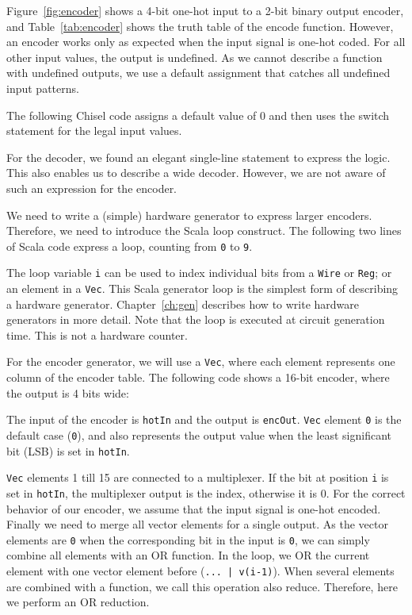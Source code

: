 \documentclass[%
    10pt,
    headinclude, footexclude,
    openright, %
    notitlepage,
    cleardoubleempty,
    headsepline,
    pointlessnumbers,
    bibtotoc, idxtotoc,
    ]{scrbook}
\newcommand{\code}[1]{{\lstinline[basicstyle=\small\ttfamily]{#1}}}
\begin{document}
Figure~\ref{fig:encoder} shows a 4-bit one-hot input to a 2-bit binary output encoder, and
Table~\ref{tab:encoder} shows the truth table of the encode function. However, an encoder
works only as expected when the input signal is one-hot coded. For all other input values, the output
is undefined. As we cannot describe a function with undefined outputs, we use a default
assignment that catches all undefined input patterns.

The following Chisel code assigns a default value of 0 and then uses the switch statement
for the legal input values.


For the decoder, we found an elegant single-line statement to express the logic.
This also enables us to describe a wide decoder. However, we are not aware
of such an expression for the encoder.

We need to write a (simple) hardware generator to express larger encoders.
Therefore, we need to introduce the Scala loop construct. The following two lines
of Scala code express a loop, counting from \code{0} to \code{9}.


\noindent The loop variable \code{i} can be used to index individual bits from a \code{Wire} or
\code{Reg}; or an element in a \code{Vec}. This Scala generator loop is the simplest form of describing
a hardware generator. Chapter~\ref{ch:gen} describes how to write hardware generators in more detail.
Note that the loop is executed at circuit generation time. This is not a hardware counter.

For the encoder generator, we will use a \code{Vec}, where each element represents one column
of the encoder table. The following code shows a 16-bit encoder, where the output is 4 bits wide:


\noindent The input of the encoder is \code{hotIn} and the output is \code{encOut}.
\code{Vec} element \code{0} is the default case (\code{0}), and also represents the output
value when the least significant bit (LSB) is set in \code{hotIn}.

\code{Vec} elements 1 till 15 are connected to a multiplexer. If the bit at position \code{i}
is set in \code{hotIn}, the multiplexer output is the index, otherwise it is 0. For the correct
behavior of our encoder, we assume that the input signal is one-hot encoded.
Finally we need to merge all vector elements for a single output. As the vector elements
are \code{0} when the corresponding bit in the input is \code{0}, we can simply combine
all elements with an OR function. In the loop, we OR the current element with one vector
element before (\code{... | v(i-1)}). When several elements are combined with a function,
we call this operation also reduce. Therefore, here we perform an OR reduction.
\end{document}
